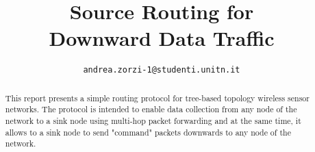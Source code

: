 \documentclass[conference]{IEEEtran}
\begin{document}
\title{Source Routing for \\ Downward Data Traffic}

\author{
	\texttt{andrea.zorzi-1@studenti.unitn.it}
}

\maketitle

\begin{abstract}
This report presents a simple routing protocol for tree-based topology wireless sensor networks. The protocol is intended to enable data collection from any node of the network to a sink node using multi-hop packet forwarding and at the same time, it allows to a sink node to send "command" packets downwards to any node of the network.
\end{abstract}

\acresetall







\end{document}
